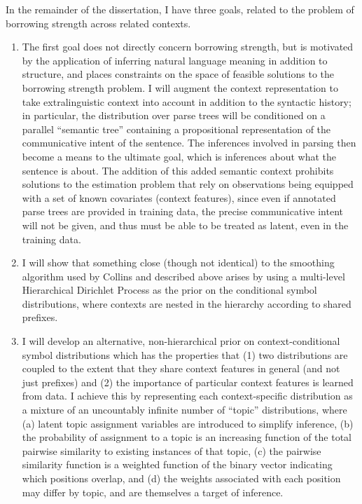 \documentclass[12pt,letterpaper]{report}
\begin{document}
In the remainder of the dissertation, I have three goals, related to
the problem of borrowing strength across related contexts.
\begin{enumerate}
\item The first goal does not directly concern borrowing strength, but
  is motivated by the application of inferring natural language
  meaning in addition to structure, and places constraints on the
  space of feasible solutions to the borrowing strength problem.  
  I will augment the context representation to take
  extralinguistic context into account in addition to the syntactic
  history; in particular, the
  distribution over parse trees will be conditioned on a parallel
  ``semantic tree'' containing a propositional representation of the
  communicative intent of the sentence.  The inferences involved in
  parsing then become a means to the ultimate goal, which is
  inferences about what the sentence is about.  The addition of this
  added semantic context prohibits solutions to the estimation problem
  that rely on observations being equipped with a set of known
  covariates (context features), since even if annotated parse trees
  are provided in training data, the precise communicative intent will
  not be given, and thus must be able to be treated as latent, even
  in the training data.
\item I will show that something close (though not identical) to the smoothing algorithm
  used by Collins and described above arises by using a multi-level Hierarchical Dirichlet
  Process as the prior on the conditional symbol distributions, where
  contexts are nested in the hierarchy according to shared prefixes.
\item I will develop an alternative, non-hierarchical prior on
  context-conditional symbol distributions which has the properties that
  (1) two distributions are coupled to the extent that they share context
  features in general (and not just prefixes) and (2) the importance of particular context
  features is learned from data.  I achieve this by representing
  each context-specific distribution as a mixture of an uncountably
  infinite number of ``topic'' distributions, where
  (a) latent topic assignment variables are introduced to simplify
  inference, (b) the probability of assignment to a topic is an
  increasing function of the total pairwise similarity to existing instances of that
  topic, (c) the pairwise similarity function is a weighted function of
  the binary vector indicating which positions overlap, and (d) the
  weights associated with each position may differ by topic, and 
  are themselves a target of inference.
\end{enumerate}
\end{document}
